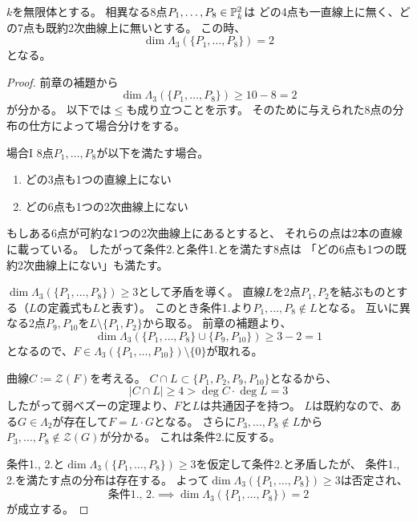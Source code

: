 \documentclass[a4paper]{jsarticle}
\begin{document}
        \begin{Them}
            $k$を無限体とする。
            相異なる8点$P_1, \dots, P_8 \in \mathbb{P}^2_k$は
            どの4点も一直線上に無く、どの7点も既約2次曲線上に無いとする。
            この時、\[ \dim\Lambda_3(\{P_1, \dots, P_8 \})=2 \]となる。
        \end{Them}
        \begin{proof}
            前章の補題から\[ \dim\Lambda_3(\{P_1, \dots, P_8 \}) \geq 10-8=2 \]が分かる。
            以下では$\leq$も成り立つことを示す。
            そのために与えられた8点の分布の仕方によって場合分けをする。

            \begin{itembox}[l]{場合I}
                8点$P_1, \dots, P_8$が以下を満たす場合。
                \begin{enumerate}
                    \item どの3点も1つの直線上にない
                    \item どの6点も1つの2次曲線上にない
                \end{enumerate}
            \end{itembox}
            もしある6点が可約な1つの2次曲線上にあるとすると、
            それらの点は2本の直線に載っている。
            したがって条件2.と条件1.とを満たす8点は
            「どの6点も1つの既約2次曲線上にない」も満たす。

            $\dim\Lambda_3(\{P_1, \dots, P_8 \}) \geq 3$として矛盾を導く。
            直線$L$を2点$P_1, P_2$を結ぶものとする（$L$の定義式も$L$と表す）。
            このとき条件1.より$P_1, \dots, P_8 \not \in L$となる。
            互いに異なる2点$P_{9}, P_{10}$を$L \setminus \{P_1, P_2\}$から取る。
            前章の補題より、
            \[ \dim \Lambda_3(\{P_1, \dots, P_8\} \cup \{ P_9, P_{10} \}) \geq 3-2=1 \]
            となるので、$F \in \Lambda_3(\{P_1, \dots, P_{10} \}) \setminus \{0\}$が取れる。

            曲線$C:=\mathcal{Z}(F)$を考える。
            $C \cap L \subset \{P_1, P_2, P_9, P_{10}\}$となるから、
            \[ |C \cap L| \geq 4 > \deg C \cdot \deg L=3 \]
            したがって弱ベズーの定理より、$F$と$L$は共通因子を持つ。
            $L$は既約なので、ある$G \in \Lambda_2$が存在して$F=L \cdot G$となる。
            さらに$P_3, \dots, P_8 \not \in L$から$P_3, \dots, P_8 \not \in \mathcal{Z}(G)$が分かる。
            これは条件2.に反する。

            条件1., 2.と$\dim \Lambda_3(\{P_1, \dots, P_8 \}) \geq 3$を仮定して条件2.と矛盾したが、
            条件1., 2.を満たす点の分布は存在する。
            よって$\dim \Lambda_3(\{P_1, \dots, P_8 \}) \geq 3$は否定され、
            \[ \mbox{条件1., 2.} \implies \dim\Lambda_3(\{P_1, \dots, P_8 \})=2 \]
            が成立する。


\end{proof}
\end{document}
